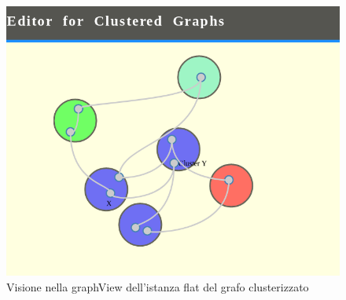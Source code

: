 \begin{figure}[!htb]
	\begin{center}
		\includegraphics[width=0.8 \linewidth]{figure/graphAfterFlat}
	\end{center}
	\caption{Visione nella graphView dell'istanza flat del grafo clusterizzato\label{fig:graphAfterFlat}}
\end{figure} 